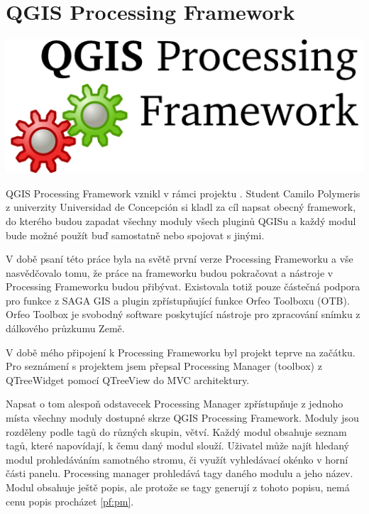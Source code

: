 \newpage
{}
\section{QGIS Processing Framework}
\nocite{pf:www}


\begin{center}
		\includegraphics[scale=0.30]{pictures/qgis_pf}
\end{center}

QGIS Processing Framework vznikl v rámci projektu  . Student Camilo Polymeris z univerzity Universidad de Concepción si kladl za cíl napsat obecný framework, do kterého budou zapadat všechny moduly všech pluginů QGISu a každý modul bude možné použít buď samostatně nebo spojovat s jinými.

V době psaní této práce byla na světě první verze Processing Frameworku a vše nasvědčovalo tomu, že práce na frameworku budou pokračovat a nástroje v Processing Frameworku budou přibývat. Existovala totiž pouze částečná  podpora pro funkce z SAGA GIS a plugin zpřístupňující funkce  Orfeo Toolboxu (OTB). Orfeo Toolbox je svobodný software poskytující nástroje pro zpracování snímku z  dálkového průzkumu Země.

V době mého připojení k Processing Frameworku byl projekt teprve na začátku. Pro seznámení s projektem jsem přepsal Processing Manager (toolbox) z QTreeWidget pomocí QTreeView do MVC architektury.

{\color{red} Napsat o tom alespoň odstavecek}
Processing Manager zpřístupňuje z jednoho místa všechny moduly dostupné skrze QGIS Processing Framework. Moduly jsou rozděleny podle tagů do různých skupin, větví. Každý modul obsahuje seznam tagů, které napovídají, k čemu daný modul slouží. Uživatel může najít hledaný modul prohledáváním samotného stromu, či využít vyhledávací okénko v horní části panelu. Processing manager prohledává tagy daného modulu a jeho název. Modul obsahuje ještě popis, ale protože se tagy generují z tohoto popisu, nemá cenu popis procházet \figurename \ref{pf:pm}.

